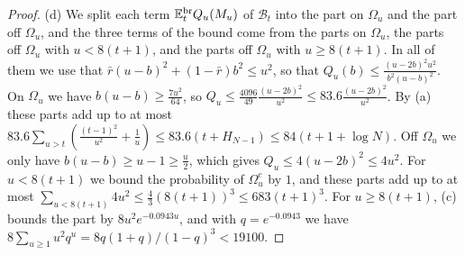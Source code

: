 \begin{proof}
(d) We split each term $\mathbb{E}^{\mathrm{br}}_tQ_u(M_u)$ of $\mathcal B_t$ into the part on
$\Omega_u$ and the part off $\Omega_u$, and the three terms of the bound
come from the parts on $\Omega_u$, the parts off $\Omega_u$ with $u<8(t+1)$,
and the parts off $\Omega_u$ with $u\ge8(t+1)$. In all of them we use that
$\bar r(u-b)^2+(1-\bar r)b^2\le u^2$, so that
$Q_u(b)\le\frac{(u-2b)^2u^2}{b^2(u-b)^2}$. On $\Omega_u$ we have
$b(u-b)\ge\frac{7u^2}{64}$, so
$Q_u\le\frac{4096}{49}\frac{(u-2b)^2}{u^2}\le83.6\frac{(u-2b)^2}{u^2}$. By (a)
these parts add up to at most
$83.6\sum_{u>t}(\frac{(t-1)^2}{u^2}+\frac1u)\le83.6(t+H_{N-1})
\le84(t+1+\log N)$.
Off $\Omega_u$ we only have $b(u-b)\ge u-1\ge\frac u2$, which gives
$Q_u\le4(u-2b)^2\le4u^2$. For $u<8(t+1)$ we bound the probability of
$\Omega_u^c$ by $1$, and these parts add up to at most
$\sum_{u<8(t+1)}4u^2\le\frac43(8(t+1))^3\le683(t+1)^3$. For $u\ge8(t+1)$,
(c) bounds the part by $8u^2e^{-0.0943u}$, and with $q=e^{-0.0943}$ we have
$8\sum_{u\ge1}u^2q^u=8q(1+q)/(1-q)^3<19100$.
\end{proof}

